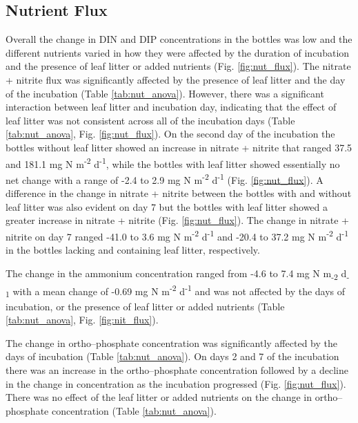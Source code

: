 
\subsection{Nutrient Flux}

Overall the change in DIN and DIP concentrations in the bottles was low and the different nutrients varied in how they were affected by the duration of incubation and the presence of leaf litter or added nutrients (Fig. \ref{fig:nut_flux}).  The nitrate + nitrite flux was significantly affected by the presence of leaf litter and the day of the incubation (Table \ref{tab:nut_anova}). However, there was a significant interaction between leaf litter and incubation day, indicating that the effect of leaf litter was not consistent across all of the incubation days (Table \ref{tab:nut_anova}, Fig. \ref{fig:nut_flux}). On the second day of the incubation the bottles without leaf litter showed an increase in nitrate + nitrite that ranged 37.5 and 181.1 mg N m\textsuperscript{-2} d\textsuperscript{-1}, while the bottles with leaf litter showed essentially no net change with a range of -2.4 to 2.9 mg N m\textsuperscript{-2} d\textsuperscript{-1} (Fig. \ref{fig:nut_flux}).  A difference in the change in nitrate + nitrite between the bottles with and without leaf litter was also evident on day 7 but the bottles with leaf litter showed a greater increase in nitrate + nitrite (Fig. \ref{fig:nut_flux}). The change in nitrate + nitrite on day 7 ranged -41.0 to 3.6 mg N m\textsuperscript{-2} d\textsuperscript{-1} and -20.4 to 37.2 mg N m\textsuperscript{-2} d\textsuperscript{-1} in the bottles lacking and containing leaf litter, respectively. 

The change in the ammonium concentration ranged from -4.6 to 7.4 mg N m\textsubscript{-2} d\textsubscript{-1} with a mean change of -0.69 mg N m\textsuperscript{-2} d\textsuperscript{-1} and was not affected by the days of incubation, or the presence of leaf litter or added nutrients (Table \ref{tab:nut_anova}, Fig. \ref{fig:nit_flux}).

The change in ortho--phosphate concentration was significantly affected by the days of incubation (Table \ref{tab:nut_anova}). On days 2 and 7 of the incubation there was an increase in the ortho--phosphate concentration followed by a decline in the change in concentration as the incubation progressed (Fig. \ref{fig:nut_flux}). There was no effect of the leaf litter or added nutrients on the change in ortho--phosphate concentration (Table \ref{tab:nut_anova}).

